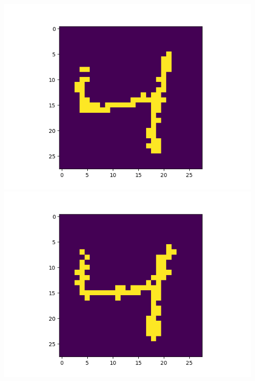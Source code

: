 \includegraphics[scale=0.2]{./bilder/comparison/prob/49}
\includegraphics[scale=0.2]{./bilder/comparison/prob/50}